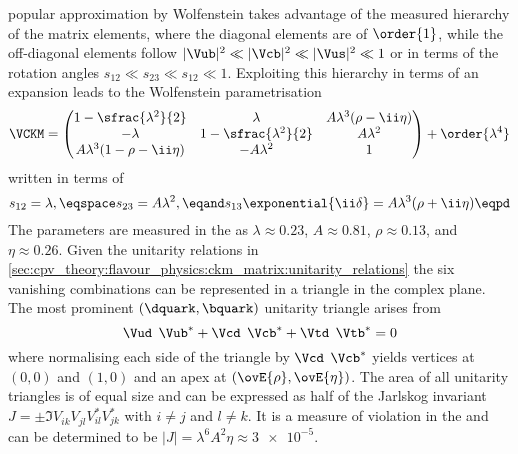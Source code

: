 popular approximation by Wolfenstein \cite{Wolfenstein:1983yz} takes advantage
of the measured hierarchy of the matrix elements, where the diagonal elements
are of $\order{1}$, while the off-diagonal elements follow $\vert\Vub\vert^2 \ll
\vert\Vcb\vert^2 \ll \vert\Vus\vert^2 \ll 1$ or in terms of the rotation angles
$s_{12} \ll s_{23} \ll s_{12} \ll 1$. Exploiting this hierarchy in terms of an
expansion leads to the Wolfenstein parametrisation
%
\begin{equation}  
  \VCKM = \begin{pmatrix}
    1 - \sfrac{\lambda^2}{2}         & \lambda                  & A \lambda^3 (\rho - \ii\eta) \\
    -\lambda                         & 1 - \sfrac{\lambda^2}{2} & A \lambda^2                  \\
    A \lambda^3 (1 - \rho - \ii\eta) & - A \lambda^2            & 1                            \\
  \end{pmatrix}
  + \order{\lambda^4}
\end{equation}
%
written in terms of
%
\begin{equation}
  s_{12} = \lambda, \eqspace s_{23} = A \lambda^2, \eqand s_{13}\exponential{\ii\delta} = A \lambda^3 (\rho + \ii\eta) \eqpd
\end{equation}
%
The parameters are measured in the \SM as $\lambda \approx 0.23$, $A \approx
0.81$, $\rho \approx 0.13$, and $\eta \approx 0.26$. Given the unitarity
relations in
\cref{sec:cpv_theory:flavour_physics:ckm_matrix:unitarity_relations} the six
vanishing combinations can be represented in a triangle in the complex plane.
The most prominent ${(\dquark,\bquark)}$ unitarity triangle arises from
%
\begin{equation}
  \Vud^{\phantom{\ast}}\Vub^{\ast} + \Vcd^{\phantom{\ast}}\Vcb^{\ast} + \Vtd^{\phantom{\ast}}\Vtb^{\ast} = 0 
\end{equation}
%
where normalising each side of the triangle by
$\Vcd^{\phantom{\ast}}\Vcb^{\ast}$ yields vertices at ${(0,0)}$ and ${(1,0)}$
and an apex at ${(\ovE{\rho},\ovE{\eta})}$. The area of all unitarity triangles
is of equal size and can be expressed as half of the Jarlskog invariant $J = \pm
\Im V_{ik}^{\phantom{\ast}} V_{jl}^{\phantom{\ast}} V_{il}^{\ast} V_{jk}^{\ast}$
with $i \neq j$ and $l \neq k$. It is a measure of \CP violation in the \SM and
can be determined to be $\vert J \vert = \lambda^6 A^2 \eta \approx \num{3e-5}$.


